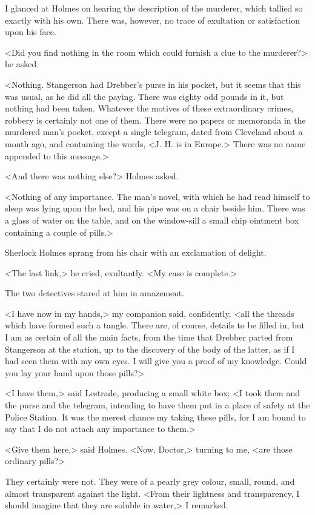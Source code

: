 I glanced at Holmes on hearing the description of the murderer, which tallied so exactly with his own. There was, however, no trace of exultation or satisfaction upon his face.

<Did you find nothing in the room which could furnish a clue to the murderer?> he asked.

<Nothing. Stangerson had Drebber's purse in his pocket, but it seems that this was usual, as he did all the paying. There was eighty odd pounds in it, but nothing had been taken. Whatever the motives of these extraordinary crimes, robbery is certainly not one of them. There were no papers or memoranda in the murdered man's pocket, except a single telegram, dated from Cleveland about a month ago, and containing the words, <J. H. is in Europe.> There was no name appended to this message.>

<And there was nothing else?> Holmes asked.

<Nothing of any importance. The man's novel, with which he had read himself to sleep was lying upon the bed, and his pipe was on a chair beside him. There was a glass of water on the table, and on the window-sill a small chip ointment box containing a couple of pills.>

Sherlock Holmes sprang from his chair with an exclamation of delight.

<The last link,> he cried, exultantly. <My case is complete.>

The two detectives stared at him in amazement.

<I have now in my hands,> my companion said, confidently, <all the threads which have formed such a tangle. There are, of course, details to be filled in, but I am as certain of all the main facts, from the time that Drebber parted from Stangerson at the station, up to the discovery of the body of the latter, as if I had seen them with my own eyes. I will give you a proof of my knowledge. Could you lay your hand upon those pills?>

<I have them,> said Lestrade, producing a small white box; <I took them and the purse and the telegram, intending to have them put in a place of safety at the Police Station. It was the merest chance my taking these pills, for I am bound to say that I do not attach any importance to them.>

<Give them here,> said Holmes. <Now, Doctor,> turning to me, <are those ordinary pills?>

They certainly were not. They were of a pearly grey colour, small, round, and almost transparent against the light. <From their lightness and transparency, I should imagine that they are soluble in water,> I remarked.

